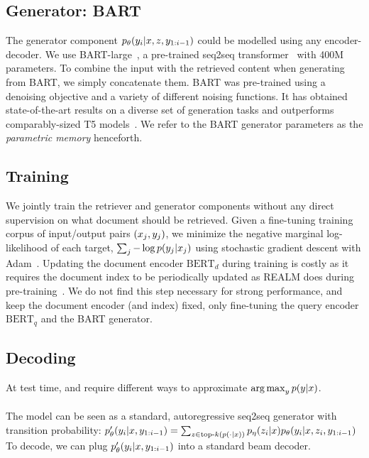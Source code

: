 \subsection{Generator: BART}
The generator component $p_{\theta}(y_i|x, z, y_{1:i-1})$ could be modelled using any encoder-decoder. We use BART-large~\cite{lewis2019bart}, a pre-trained seq2seq transformer~\cite{vaswani2017attention} with 400M parameters. To combine the input \query{} with the retrieved content \doc{} when generating from BART, we simply concatenate them.
BART was pre-trained using a denoising objective and a variety of different noising functions. It has obtained state-of-the-art results on a diverse set of generation tasks and outperforms comparably-sized T5 models~\cite{lewis2019bart}. 
We refer to the BART generator parameters \genparam{} as the \emph{parametric memory} henceforth.


\subsection{Training}
We jointly train the retriever and generator components without any direct supervision on what document should be retrieved.
Given a fine-tuning training corpus of input/output pairs $(x_j,y_j)$, we minimize the negative marginal log-likelihood of each target, $\sum_j -\log p(y_j|x_j)$ using stochastic gradient descent with Adam~\cite{kingma_adam}.
Updating the document encoder $\text{BERT}_d$ during training is costly as it requires the document index to be periodically updated as REALM does during pre-training~\cite{guu2020realm}. We do not find this step necessary for strong performance, and keep the document encoder (and index) fixed, only fine-tuning the query encoder $\text{BERT}_q$ and the BART generator.

\subsection{Decoding}

At test time, \raganswer{} and \ragtoken{} require different ways to approximate $\operatorname*{arg\,max}_{y} p(y|x)$.

\paragraph{\ragtoken{}} The \ragtoken{} model can be seen as a standard, autoregressive seq2seq generator with transition probability: 
$p'_{\theta}(y_i|x, y_{1:i-1}) = \sum_{z \in \text{top-}k(p(\cdot|x))} p_{\eta}(z_i|x) p_{\theta}(y_i|x, z_i, y_{1:i-1})$
To decode, we can plug $p'_{\theta}(y_i|x, y_{1:i-1})$ into a standard beam decoder.

